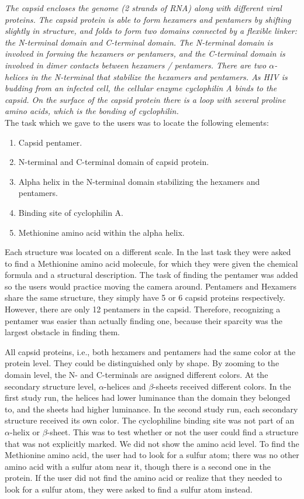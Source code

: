 \documentclass[review,journal]{vgtc}         %
\begin{document}
	\textit{
		The capsid encloses the genome (2 strands of RNA) along with different viral proteins. 
		The capsid protein is able to form hexamers and pentamers by shifting slightly in structure, and folds to form two domains connected by a flexible linker: the N-terminal domain and C-terminal domain. 
		The N-terminal domain is involved in forming the hexamers or pentamers, and the C-terminal domain is involved in dimer contacts between hexamers / pentamers. 
		There are two $\alpha$-helices in the N-terminal that stabilize the hexamers and pentamers. 
		As HIV is budding from an infected cell, the cellular enzyme cyclophilin A binds to the capsid. 
		On the surface of the capsid protein there is a loop with several proline amino acids, which is the bonding of cyclophilin.}\\
	
	The task which we gave to the users was to locate the following elements:
	
	\begin{enumerate}
		\itemsep0em 
		\item Capsid pentamer.
		\item N-terminal and C-terminal domain of capsid protein.
		\item Alpha helix in the N-terminal domain stabilizing the hexamers and pentamers.
		\item Binding site of cyclophilin A.
		\item Methionine amino acid within the alpha helix.
	\end{enumerate}
	
	Each structure was located on a different scale. 
	In the last task they were asked to find a Methionine amino acid molecule, for which they were given the chemical formula and a structural description.
	The task of finding the pentamer was added so the users would practice moving the camera around. 
	Pentamers and Hexamers share the same structure, they simply have 5 or 6 capsid proteins respectively. 
	However, there are only 12 pentamers in the capsid.
	Therefore, recognizing a pentamer was easier than actually finding one, because their sparcity was the largest obstacle in finding them.
	
	All capsid proteins, i.e., both hexamers and pentamers had the same color at the protein level. They could be distinguished only by shape. By zooming to the domain level, the N- and C-terminals are assigned different colors. At the secondary structure level, $\alpha$-helices and $\beta$-sheets received different colors. In the first study run, the helices had lower luminance than the domain they belonged to, and the sheets had higher luminance. In the second study run, each secondary structure received its own color. 
	The cyclophiline binding site was not part of an $\alpha$-helix or $\beta$-sheet.
	This was to test whether or not the user could find a structure that was not explicitly marked. 
	We did not show the amino acid level.
	To find the Methionine amino acid, the user had to look for a sulfur atom; there was no other amino acid with a sulfur atom near it, though there is a second one in the protein. 
	If the user did not find the amino acid or realize that they needed to look for a sulfur atom, they were asked to find a sulfur atom instead.
	
\end{document}
